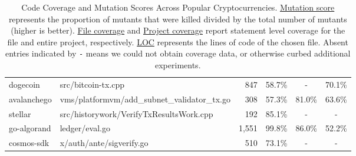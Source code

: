 \begin{table}[ht!]
\begin{tabular}{llrccc}
\cmidrule{2-6}
dogecoin                        & src/bitcoin-tx.cpp                            & 847              & 58.7\%                  & -                       & 70.1\%                   \\
\cmidrule{2-6}
avalanchego                     & vms/platformvm/add\_subnet\_validator\_tx.go  & 308              & 57.3\%                  & 81.0\%                  & 63.6\%                   \\
\cmidrule{2-6}
  stellar                       & src/historywork/VerifyTxResultsWork.cpp       & 192              & 85.1\%                  & -                       & -                        \\
\cmidrule{2-6}
go-algorand                     & ledger/eval.go                                & 1,551            & 99.8\%                  & 86.0\%                  & 52.2\%                   \\
\cmidrule{2-6}
cosmos-sdk                      & x/auth/ante/sigverify.go                      & 510              & 73.1\%                  & -                       &  -                       \\
\bottomrule
\end{tabular}
\caption{Code Coverage and Mutation Scores Across Popular Cryptocurrencies. \underline{Mutation score} represents the proportion of mutants that were killed divided by the total number of mutants (higher is better).
\underline{File coverage} and \underline{Project coverage} report statement level coverage for the file and entire project, respectively. \underline{LOC} represents the lines of code of the chosen file. Absent entries indicated by \texttt{-} means we could not
obtain coverage data, or otherwise curbed additional experiments.
}
\label{tab:comparison}
\end{table}


